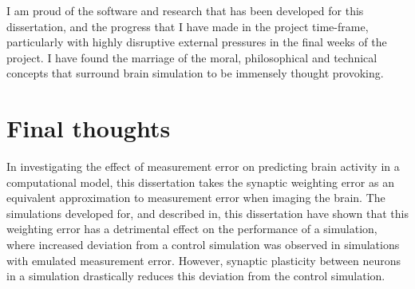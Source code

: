I am proud of the software and research that has been developed for this
dissertation, and  the progress that I have made in the project time-frame,
particularly with highly disruptive external pressures in the final weeks of the
project. I have found the marriage of the moral, philosophical and technical
concepts that surround brain simulation to be immensely thought provoking.

\section{Final thoughts}

In investigating the effect of measurement error on predicting brain activity in
a computational model, this dissertation takes the synaptic weighting error as
an equivalent approximation to measurement error when imaging the brain. The
simulations developed for, and described in, this dissertation have shown that
this weighting error has a detrimental effect on the performance of a
simulation, where increased deviation from a control simulation was observed in
simulations with emulated measurement error. However, synaptic plasticity
between neurons in a simulation drastically reduces this deviation from the
control simulation.







